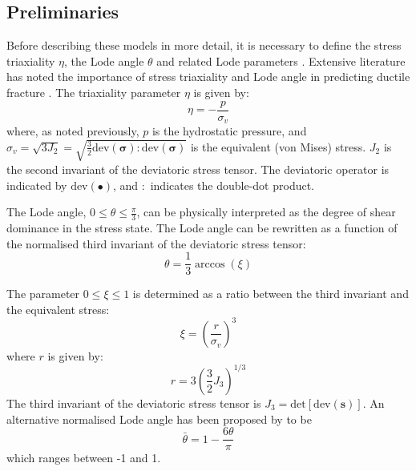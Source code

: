 \documentclass[sn-mathphys,Numbered]{sn-jnl}%
\newcommand{\bb}{\boldsymbol}
\begin{document}
\subsection{Preliminaries}
Before describing these models in more detail, it is necessary to define the stress triaxiality $\eta$, the Lode angle $\theta$ and related Lode parameters \cite{bai_new_2008, nahshon_modification_2008}.
Extensive literature has noted the importance of stress triaxiality and Lode angle in predicting ductile fracture \cite{besson_continuum_2010, cao_models_2017, tekkaya_damage_2020}.
The triaxiality parameter $\eta$ is given by:
\begin{equation} %
    \eta = -\frac{p}{\sigma_{v}}
\end{equation}
where, as noted previously, $p$ is the hydrostatic pressure, and $\sigma_{v} = \sqrt{3 J_2} = \sqrt{\frac{3}{2} \text{dev}(\bb{\sigma}) : \text{dev}(\bb{\sigma}) }$ is the equivalent (von Mises) stress.
$J_2$ is the second invariant of the deviatoric stress tensor.
The deviatoric operator is indicated by $\text{dev}(\bullet)$, and $:$ indicates the double-dot product.

The Lode angle, $0 \leq \theta \leq \frac{\pi}{3}$, can be physically interpreted as the degree of shear dominance in the stress state.
The Lode angle can be rewritten as a function of the normalised third invariant of the deviatoric stress tensor:
\begin{equation}
    \theta=\frac{1}{3} \arccos\left(\xi\right)
\end{equation}

The parameter $0 \leq \xi \leq 1$ is determined as a ratio between the third invariant and the equivalent stress:
\begin{equation}
	\xi = \left(\frac{r}{\sigma_{v}}\right)^3
\end{equation}
where $r$ is given by:
\begin{equation}
	r  = 3 \left(\frac{3}{2}J_3\right)^{1/3} %
\end{equation}
The third invariant of the deviatoric stress tensor is $J_3 = \text{det}[\text{dev}(\bb{s})]$.
An alternative normalised Lode angle has been proposed by \citet{bai_new_2008} to be
\begin{equation}
	\bar{\theta}=1-\frac{6\theta}{\pi}	
\end{equation}
which ranges between -1 and 1.
\end{document}
